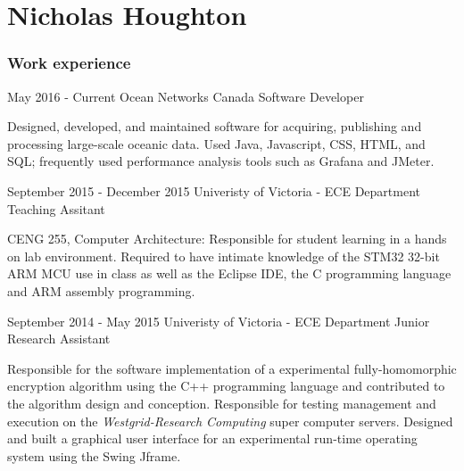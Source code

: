 \documentclass{tccv}
\begin{document}
\part{Nicholas Houghton}

\section{Work experience}

\begin{eventlist}
\small
\item{May 2016 - Current}
		{Ocean Networks Canada}
		{Software Developer}
		
Designed, developed, and maintained software for acquiring, publishing and processing large-scale oceanic data. Used Java, Javascript, CSS, HTML, and SQL; frequently used performance analysis tools such as Grafana and JMeter.

\item{September 2015 - December 2015}
     {Univeristy of Victoria - ECE Department}
     {Teaching Assitant}

CENG 255, Computer Architecture: Responsible for student learning in a hands on lab environment. Required to 
have intimate knowledge of the STM32 32-bit ARM MCU use in class as well as the Eclipse IDE, the C programming language and ARM assembly programming.

\item{September 2014 - May 2015}
     {Univeristy of Victoria - ECE Department}
     {Junior Research Assistant}

Responsible for the software implementation of a experimental fully-homomorphic encryption algorithm using the C++ programming language and contributed to the algorithm design and conception. Responsible for testing management and execution on the \textit{Westgrid-Research Computing} super computer servers. Designed and built a graphical user interface for an experimental run-time operating system using the Swing Jframe.

%

%


\end{eventlist}
\end{document}
